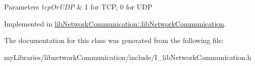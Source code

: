 \begin{DoxyParams}{Parameters}
{\em tcp\+Or\+U\+DP} & 1 for T\+CP, 0 for U\+DP \\
\hline
\end{DoxyParams}


Implemented in \mbox{\hyperlink{classlibNetworkCommunication_1_1libNetworkCommunication_a620cba1d9e2204dc9ef6b6897e8b6736}{lib\+Network\+Communication\+::lib\+Network\+Communication}}.



The documentation for this class was generated from the following file\+:\begin{DoxyCompactItemize}
\item 
my\+Libraries/libnetwork\+Communication/include/I\+\_\+lib\+Network\+Communication.\+h\end{DoxyCompactItemize}
